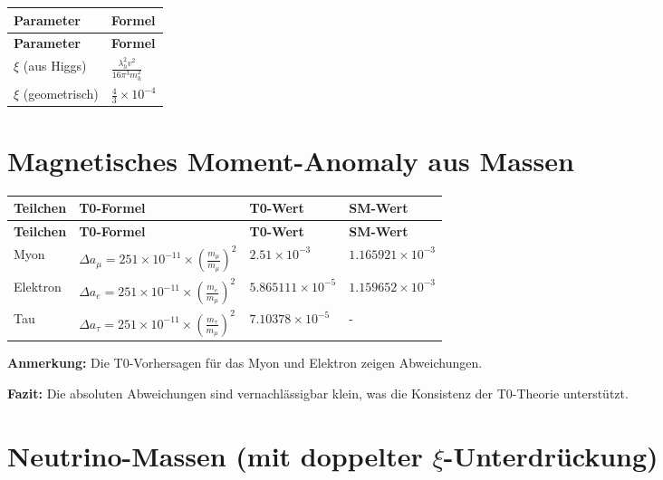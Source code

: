 \documentclass[12pt,a4paper]{article}
\begin{document}
	\begin{longtable}{|p{3cm}|p{5cm}|}
		\hline
		\textbf{Parameter} & \textbf{Formel} \\
		\hline
		\endfirsthead
		\hline
		\textbf{Parameter} & \textbf{Formel} \\
		\hline
		\endhead
		\(\xi\) (aus Higgs) & \(\frac{\lambda_h^{2}v^{2}}{16\pi^{3}m_h^{2}}\) \\
		\hline
		\(\xi\) (geometrisch) & \(\frac{4}{3} \times 10^{-4}\) \\
		\hline
	\end{longtable}
	
	\section{Magnetisches Moment-Anomaly aus Massen}
	
	\begin{longtable}{|p{2.5cm}|p{4.5cm}|p{4cm}|p{3cm}|}
		\hline
		\textbf{Teilchen} & \textbf{T0-Formel} & \textbf{T0-Wert} & \textbf{SM-Wert} \\
		\hline
		\endfirsthead
		\hline
		\textbf{Teilchen} & \textbf{T0-Formel} & \textbf{T0-Wert} & \textbf{SM-Wert} \\
		\hline
		\endhead
		Myon & \(\Delta a_{\mu} = 251 \times 10^{-11} \times \left(\frac{m_{\mu}}{m_{\mu}}\right)^{2}\) & \(2.51 \times 10^{-3}\) & \(1.165921 \times 10^{-3}\) \\
		\hline
		Elektron & \(\Delta a_{e} = 251 \times 10^{-11} \times \left(\frac{m_{e}}{m_{\mu}}\right)^{2}\) & \(5.865111 \times 10^{-5}\) & \(1.159652 \times 10^{-3}\) \\
		\hline
		Tau & \(\Delta a_{\tau} = 251 \times 10^{-11} \times \left(\frac{m_{\tau}}{m_{\mu}}\right)^{2}\) & \(7.10378 \times 10^{-5}\) & - \\
		\hline
	\end{longtable}
	
	\textbf{Anmerkung:} Die T0-Vorhersagen für das Myon und Elektron zeigen Abweichungen.
	
	\textbf{Fazit:} Die absoluten Abweichungen sind vernachlässigbar klein, was die Konsistenz der T0-Theorie unterstützt.
	
	\section{Neutrino-Massen (mit doppelter \(\xi\)-Unterdrückung)}
	
\end{document}
